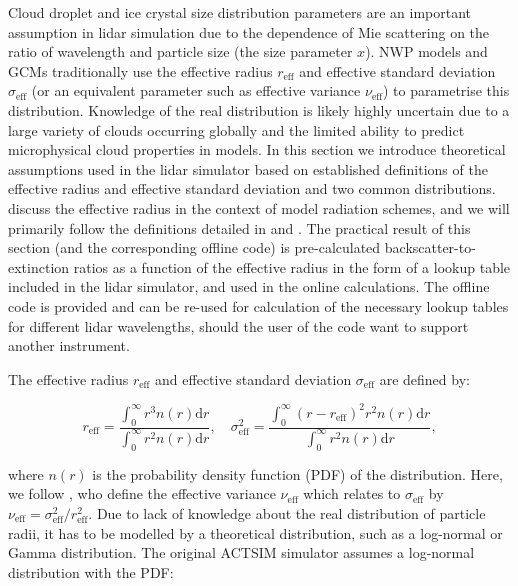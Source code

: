 Cloud droplet and ice crystal size distribution parameters are an important assumption
in lidar simulation due to the dependence of Mie scattering on the ratio of
wavelength and particle size (the size parameter $x$). NWP models and GCMs
traditionally use the effective radius $r_\text{eff}$ and effective standard
deviation $\sigma_\text{eff}$ (or an equivalent parameter such as effective variance $\nu_\text{eff}$)
 to parametrise this distribution. Knowledge of the real distribution is likely highly
uncertain due to a large variety of clouds occurring globally and the limited
ability to predict microphysical cloud properties in models. In this section
we introduce theoretical assumptions used in the lidar simulator based on established
definitions of the effective radius and effective standard deviation and two
common distributions.
\cite{edwards1996} discuss the effective radius in the context of model radiation
schemes, and we will primarily follow the definitions detailed in \cite{chang2001} and
\cite{petty2011}. The practical result of this section (and the corresponding
offline code) is pre-calculated backscatter-to-extinction ratios as a function of
the effective radius in the form of a lookup table included in the lidar
simulator, and used in the online calculations. The offline code
is provided and can be re-used for calculation of the necessary lookup tables for
different lidar wavelengths, should the user of the code want to support another
instrument.

The effective radius $r_\text{eff}$ and effective standard deviation $\sigma_\text{eff}$
are defined by:

\begin{equation}
\label{eq:eff}
r_\text{eff} = \frac{\int_0^\infty r^3 n(r)\mathrm{d}r}{\int_0^\infty r^2 n(r)\mathrm{d}r}, \quad
\sigma_\text{eff}^2 = \frac{\int_0^\infty (r - r_\text{eff})^2 r^2 n(r) \mathrm{d}r}{\int_0^\infty r^2 n(r) \mathrm{d}r} ,
\end{equation}

where $n(r)$ is the probability density function (PDF) of the distribution.
Here, we follow \cite{petty2011}, who define the effective variance
$\nu_\text{eff}$ which relates to $\sigma_\text{eff}$
by $\nu_\text{eff} = \sigma_\text{eff}^2 / r_\text{eff}^2$.
Due to lack of knowledge about the real distribution of particle radii, it has to be modelled by a
theoretical distribution, such as a log-normal or Gamma distribution.
The original ACTSIM simulator assumes a log-normal distribution \citep{chiriaco2006}
with the PDF:

